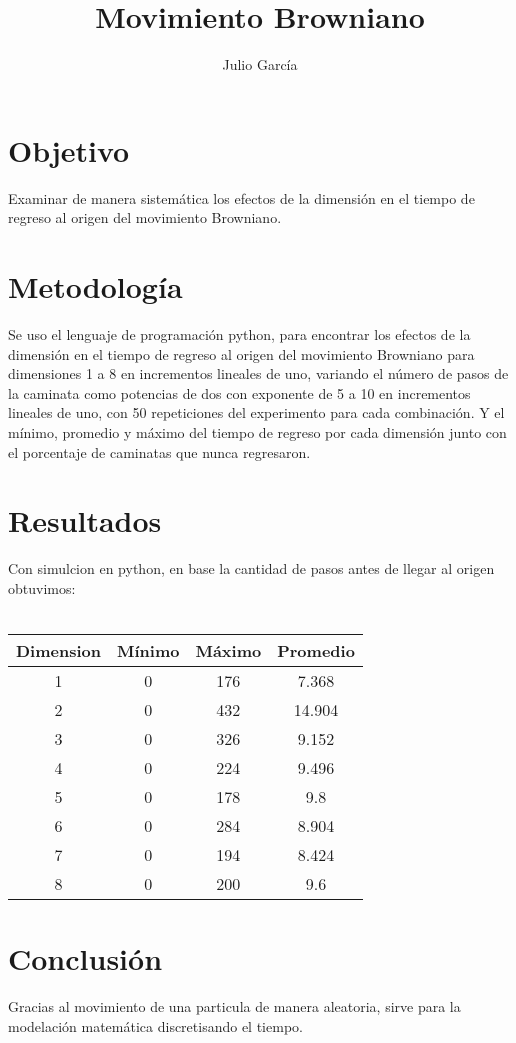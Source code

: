 \documentclass{article}
\title { Movimiento Browniano}
\author{Julio Garc\'ia}
\begin{document}
\maketitle

\section{Objetivo}
Examinar de manera sistemática los efectos de la dimensión en el tiempo de regreso al origen del movimiento Browniano.

\section{Metodolog\'ia}
Se uso el  lenguaje de programación python, para encontrar	los efectos de la dimensión en el tiempo de regreso al origen del movimiento Browniano para dimensiones 1 a 8 en incrementos lineales de uno, variando el número de pasos de la caminata como potencias de dos con exponente de 5 a 10 en incrementos lineales de uno, con 50 repeticiones del experimento para cada combinación. Y el mínimo, promedio y máximo del tiempo de regreso por cada dimensión junto con el porcentaje de caminatas que nunca regresaron.

\newpage
\section{Resultados}
Con simulcion en python, en base  la cantidad de pasos antes de llegar al origen obtuvimos: \\ \\


\begin{tabular}{| c | c | c | c |}
	\hline
	Dimension & Mínimo & Máximo & Promedio\\ \hline
	1 & 0 & 176 & 7.368 \\
	2 & 0 & 432 & 14.904\\
	3 & 0 & 326 & 9.152\\
	4 & 0 & 224 & 9.496\\
	5 & 0 & 178 & 9.8\\
	6 & 0 & 284 & 8.904\\
	7 & 0 & 194 & 8.424\\
	8 & 0 & 200 & 9.6\\ \hline

	
\end{tabular}

\section{Conclusi\'on}
Gracias al movimiento de una particula de manera aleatoria, sirve para la modelación matemática discretisando el tiempo.



\end{document}
